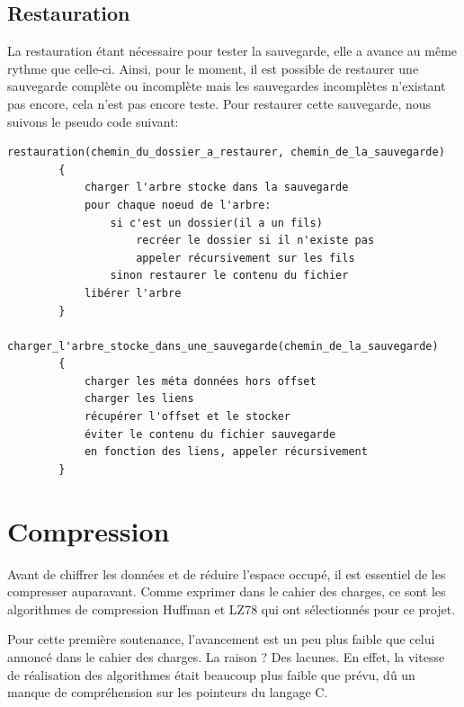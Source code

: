     \subsection{Restauration}
        La restauration étant nécessaire pour tester la sauvegarde, elle a avance au même rythme que celle-ci. Ainsi, pour le moment, il est possible de restaurer une sauvegarde complète ou incomplète mais les sauvegardes incomplètes n'existant pas encore, cela n'est pas encore teste. Pour restaurer cette sauvegarde, nous suivons le pseudo code suivant:
        \begin{lstlisting}[style=CStyle]
        restauration(chemin_du_dossier_a_restaurer, chemin_de_la_sauvegarde)
        {
            charger l'arbre stocke dans la sauvegarde
            pour chaque noeud de l'arbre:
                si c'est un dossier(il a un fils)
                    recréer le dossier si il n'existe pas
                    appeler récursivement sur les fils
                sinon restaurer le contenu du fichier
            libérer l'arbre
        }
        charger_l'arbre_stocke_dans_une_sauvegarde(chemin_de_la_sauvegarde)
        {
            charger les méta données hors offset
            charger les liens
            récupérer l'offset et le stocker
            éviter le contenu du fichier sauvegarde
            en fonction des liens, appeler récursivement
        }        \end{lstlisting}
        
        
\newpage

\section{Compression}
    Avant de chiffrer les données et de réduire l'espace occupé, il est essentiel de les compresser auparavant. Comme exprimer dans le cahier des charges, ce sont les algorithmes de compression Huffman et LZ78 qui ont sélectionnés pour ce projet.
    
    Pour cette première soutenance, l'avancement est un peu plus faible que celui annoncé dans le cahier des charges. La raison ? Des lacunes. En effet, la vitesse de réalisation des algorithmes était beaucoup plus faible que prévu, dû un manque de compréhension sur les pointeurs du langage C.
    
